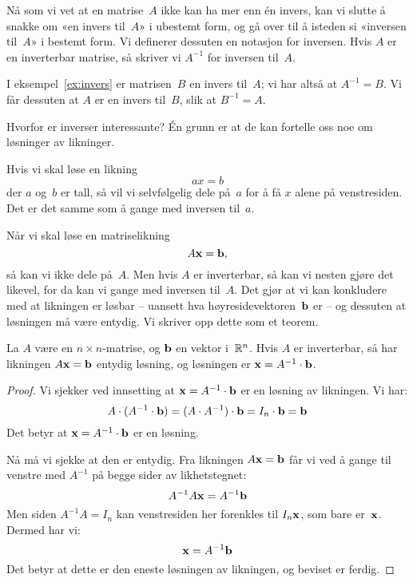 Nå som vi vet at en matrise~$A$ ikke kan ha mer enn én invers, kan vi
slutte å snakke om «en invers til~$A$» i ubestemt form, og gå over til
å isteden si «inversen til~$A$» i bestemt form.  Vi definerer dessuten
en notasjon for inversen.  Hvis $A$ er en inverterbar matrise, så
skriver vi $A^{-1}$ for inversen til~$A$.

\begin{ex}
I eksempel~\ref{ex:invers} er matrisen~$B$ en invers til~$A$; vi har
altså at $A^{-1} = B$.  Vi får dessuten at $A$ er en invers til~$B$,
slik at $B^{-1} = A$.
\end{ex}

Hvorfor er inverser interessante?  Én grunn er at de kan fortelle oss
noe om løsninger av likninger.

Hvis vi skal løse en likning
\[
ax = b
\]
der $a$ og~$b$ er tall, så vil vi selvfølgelig dele på~$a$ for å få
$x$ alene på venstresiden.  Det er det samme som å gange med inversen
til~$a$.

Når vi skal løse en matriselikning
\[
A \mathbf{x} = \mathbf{b},
\]
så kan vi ikke dele på~$A$.  Men hvis $A$ er inverterbar, så kan vi
nesten gjøre det likevel, for da kan vi gange med inversen til~$A$.
Det gjør at vi kan konkludere med at likningen er løsbar -- uansett
hva høyresidevektoren~$\mathbf{b}$ er -- og dessuten at løsningen må være
entydig.  Vi skriver opp dette som et teorem.

\begin{thm}
\label{thm:invers-Ax=b}
La $A$ være en $n \times n$-matrise, og $\mathbf{b}$ en vektor i~$\mathbb{R}^n$.
Hvis $A$ er inverterbar, så har likningen $A \mathbf{x} = \mathbf{b}$ entydig
løsning, og løsningen er $\mathbf{x} = A^{-1} \cdot \mathbf{b}$.
\end{thm}
\begin{proof}
Vi sjekker ved innsetting at $\mathbf{x} = A^{-1} \cdot \mathbf{b}$ er en
løsning av likningen.  Vi har:
\[
A \cdot (A^{-1} \cdot \mathbf{b})
 = (A \cdot A^{-1}) \cdot \mathbf{b}
 = I_n \cdot \mathbf{b}
 = \mathbf{b}
\]
Det betyr at $\mathbf{x} = A^{-1} \cdot \mathbf{b}$ er en løsning.

Nå må vi sjekke at den er entydig.  Fra likningen $A \mathbf{x} = \mathbf{b}$
får vi ved å gange til venstre med $A^{-1}$ på begge sider av
likhetstegnet:
\[
A^{-1} A \mathbf{x} = A^{-1} \mathbf{b}
\]
Men siden $A^{-1} A = I_n$ kan venstresiden her forenkles til
$I_n \mathbf{x}$, som bare er~$\mathbf{x}$.  Dermed har vi:
\[
\mathbf{x} = A^{-1} \mathbf{b}
\]
Det betyr at dette er den eneste løsningen av likningen, og beviset er
ferdig.
\end{proof}

